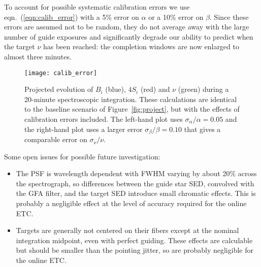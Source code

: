 \documentclass[11pt]{article}
\providecommand{\eqn}[1]{eqn.~(\ref{eqn:#1})}
\providecommand{\fig}[1]{Figure~\ref{fig:#1}}
\begin{document}
To account for possible systematic calibration errors we use \eqn{calib_error} with a 5\% error on $\alpha$ or a 10\% error on $\beta$. Since these errors are assumed not to be random, they do not average away with the large number of guide exposures and significantly degrade our ability to predict when the target $\nu$ has been reached: the completion windows are now enlarged to almost three minutes.

\begin{figure}[htb]
\begin{center}
\texttt{[image: calib\_error]}
\caption{Projected evolution of $B_i$ (blue), $4 S_i$ (red) and $\nu$ (green) during a 20-minute spectroscopic integration. These calculations are identical to the baseline scenario of \fig{project}, but with the effects of calibration errors included.  The left-hand plot uses $\sigma_\alpha/\alpha = 0.05$ and the right-hand plot uses a larger error $\sigma_\beta/\beta = 0.10$ that gives a comparable error on $\sigma_\nu/\nu$.}
\label{fig:calib_error}
\end{center}
\end{figure}

Some open issues for possible future investigation:
\begin{itemize}
\item The PSF is wavelength dependent with FWHM varying by about 20\% across the spectrograph, so differences between the guide star SED, convolved with the GFA filter, and the target SED introduce small chromatic effects. This is probably a negligible effect at the level of accuracy required for the online ETC.
\item Targets are generally not centered on their fibers except at the nominal integration midpoint, even with perfect guiding. These effects are calculable but should be smaller than the pointing jitter, so are probably negligible for the online ETC.
\end{itemize}
\end{document}
